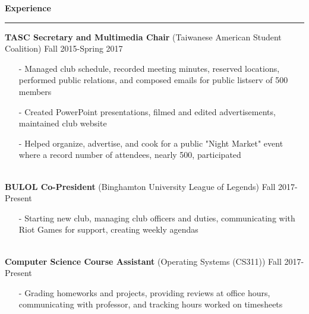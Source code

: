 \documentclass[11pt]{article}
\newcommand{\Hrule}{\vspace{1mm}\hrule\vspace{1mm}}
\begin{document}
    \noindent\large\textbf{Experience}
        \Hrule
        \indent\small{\textbf{TASC Secretary and Multimedia Chair} (Taiwanese American Student Coalition)} \hfill \small{Fall 2015-Spring 2017}\indent\vspace{0.5mm}
            \indent\begin{minipage}{\dimexpr\textwidth-6cm}
                \begin{itemize}[noitemsep, topsep=0pt]
                    \item[-] Managed club schedule, recorded meeting minutes, reserved locations, performed public relations, and composed emails for public listserv of 500 members
                    \item[-] Created PowerPoint presentations, filmed and edited advertisements, maintained club website
                    \item[-] Helped organize, advertise, and cook for a public "Night Market" event where a record number of attendees, nearly 500, participated
                \end{itemize}\vspace{0mm}
            \end{minipage}\\
        \indent\small{\textbf{BULOL Co-President} (Binghamton University League of Legends)} \hfill \small{Fall 2017-Present}\indent\vspace{0.5mm}\\
            \indent\begin{minipage}{\dimexpr\textwidth-6cm}
                \begin{itemize}[noitemsep, topsep=0pt]
                    \item[-] Starting new club, managing club officers and duties, communicating with Riot Games for support, creating weekly agendas
                \end{itemize}\vspace{0mm}
            \end{minipage}\\
        \indent\small{\textbf{Computer Science Course Assistant} (Operating Systems (CS311))} \hfill \small{Fall 2017-Present}\indent\vspace{0.5mm}\\
            \indent\begin{minipage}{\dimexpr\textwidth-6cm}
                \begin{itemize}[noitemsep, topsep=0pt]
                    \item[-] Grading homeworks and projects, providing reviews at office hours, communicating with professor, and tracking hours worked on timesheets                    
                \end{itemize}\vspace{0mm}
            \end{minipage}\\
\end{document}
